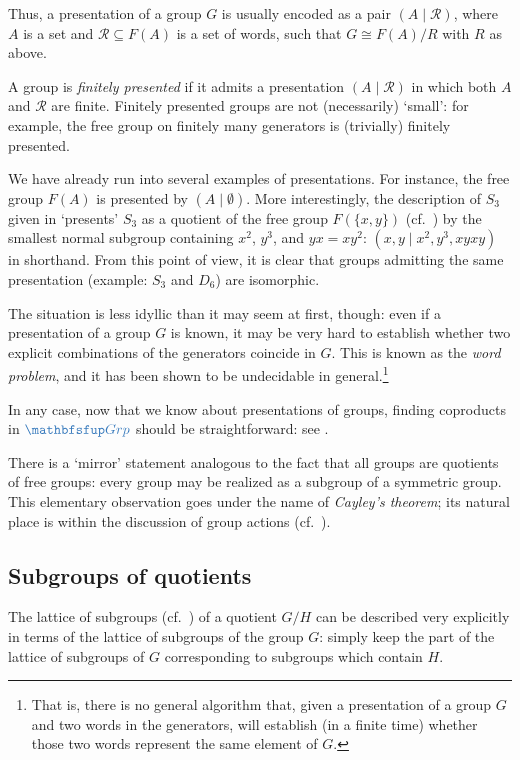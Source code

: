Thus, a presentation of a group $G$ is usually encoded as a pair
$(A \mid \mathscr{R})$, where $A$ is a set and
$\mathscr{R} \subseteq F(A)$ is a set of words, such that
$G \cong F(A)/R$ with $R$ as above.

A group is \emph{finitely presented} if it admits a presentation
$(A \mid \mathscr{R})$ in which both $A$ and $\mathscr{R}$ are finite.
Finitely presented groups are not (necessarily) `small': for example,
the free group on finitely many generators is (trivially) finitely
presented.

We have already run into several examples of presentations. For
instance, the free group $F(A)$ is presented by $(A \mid \emptyset)$.
More interestingly, the description of $S_3$ given in
 `presents' $S_3$ as a
quotient of the free group $F(\{x,y\})$ (cf.\
) by the
smallest normal subgroup containing $x^2$, $y^3$, and $yx = xy^2$:
$(x,y \mid x^2, y^3, xyxy)$ in shorthand. From this point of view, it
is clear that groups admitting the same presentation (example: $S_3$
and $D_6$) are isomorphic.

The situation is less idyllic than it may seem at first, though: even
if a presentation of a group $G$ is known, it may be very hard to
establish whether two explicit combinations of the generators coincide
in $G$. This is known as the \emph{word problem}, and it has been
shown to be undecidable in general.\footnote{That is, there is no
  general algorithm that, given a presentation of a group $G$ and two
  words in the generators, will establish (in a finite time) whether
  those two words represent the same element of $G$.}

In any case, now that we know about presentations of groups, finding
coproducts in $\categ{Grp}$ should be straightforward: see
.

There is a `mirror' statement analogous to the fact that all groups
are quotients of free groups: every group may be realized as a
subgroup of a symmetric group. This elementary observation goes under
the name of \emph{Cayley's theorem}; its natural place is within the
discussion of group actions (cf.\ \Cref{thm:groups:cayleys-theorem}).

\subsection{Subgroups of quotients}
\label{subsec:groups:subgroups-of-quotients}
The lattice of subgroups (cf.\
) of a
quotient $G/H$ can be described very explicitly in terms of the
lattice of subgroups of the group $G$: simply keep the part of the
lattice of subgroups of $G$ corresponding to subgroups which contain
$H$.

